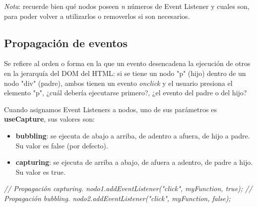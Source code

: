 \textit{Nota}: recuerde bien qué nodos poseen \textit{n} números de Event Listener y cuales son, para poder volver a utilizarlos o removerlos si son necesarios.


\subsection{Propagación de eventos}
\hspace{0.55cm}Se refiere al orden o forma en la que un evento desencadena la ejecución de otros en la jerarquía del DOM del HTML: si se tiene un nodo "p" (hijo) dentro de un nodo "div" (padre), ambos tienen un evento \textit{onclick} y el usuario presiona el elemento "p", ¿cuál debería ejecutarse primero?, ¿el evento del padre o del hijo?

Cuando asignamos Event Listeners a nodos, uno de sus parámetros es \textbf{useCapture}, sus valores son:
\begin{itemize}
    \item \textbf{bubbling}: se ejecuta de abajo a arriba, de adentro a afuera, de hijo a padre. Su valor es false (por defecto).
    \item \textbf{capturing}: se ejecuta de arriba a abajo, de afuera a adentro, de padre a hijo. Su valor es true.
\end{itemize}
\begin{center}
    \textit{
            // Propagación capturing.
            nodo1.addEventListener("click", myFunction, true); 
            // Propagación bubbling.
            nodo2.addEventListener("click", myFunction, false);
            }
\end{center}


